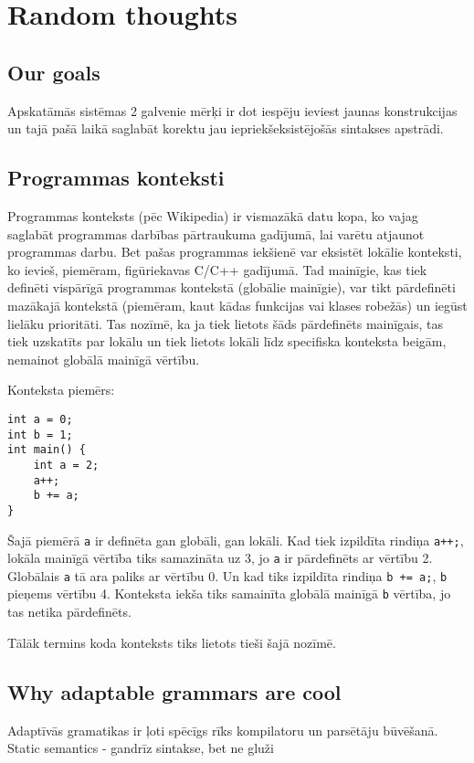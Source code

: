 \section{Random thoughts}
\subsection{Our goals}
Apskatāmās sistēmas 2 galvenie mērķi ir dot iespēju ieviest jaunas konstrukcijas un tajā pašā laikā saglabāt korektu jau iepriekšeksistējošās sintakses apstrādi.

\subsection{Programmas konteksti}
Programmas konteksts (pēc Wikipedia) ir vismazākā datu kopa, ko vajag saglabāt programmas darbības pārtraukuma gadījumā, lai varētu atjaunot programmas darbu. Bet pašas programmas iekšienē var eksistēt lokālie konteksti, ko ievieš, piemēram, figūriekavas C/C++ gadījumā. Tad mainīgie, kas tiek definēti vispārīgā programmas kontekstā (globālie mainīgie), var tikt pārdefinēti mazākajā kontekstā (piemēram, kaut kādas funkcijas vai klases robežās) un iegūst lielāku prioritāti. Tas nozīmē, ka ja tiek lietots šāds pārdefinēts mainīgais, tas tiek uzskatīts par lokālu un tiek lietots lokāli līdz specifiska konteksta beigām, nemainot globālā mainīgā vērtību.

Konteksta piemērs:
\begin{singlespace}
\begin{verbatim}
int a = 0;
int b = 1;
int main() {
    int a = 2;
    a++;
    b += a;
}
\end{verbatim}
\end{singlespace}
Šajā piemērā \verb|a| ir definēta gan globāli, gan lokāli. Kad tiek izpildīta rindiņa \verb|a++;|, lokāla mainīgā vērtība tiks samazināta uz 3, jo \verb|a| ir pārdefinēts ar vērtību 2. Globālais \verb|a| tā ara paliks ar vērtību 0. Un kad tiks izpildīta rindiņa \verb|b += a;|, \verb|b| pieņems vērtību 4. Konteksta iekša tiks samainīta globālā mainīgā \verb|b| vērtība, jo tas netika pārdefinēts.

Tālāk termins koda konteksts tiks lietots tieši šajā nozīmē. 

\subsection{Why adaptable grammars are cool}
Adaptīvās gramatikas ir ļoti spēcīgs rīks kompilatoru un parsētāju būvēšanā. 
Static semantics - gandrīz sintakse, bet ne gluži

